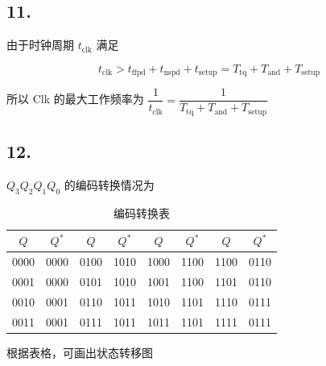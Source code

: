 \documentclass[12pt, a4paper]{ctexart}
\begin{document}
\subsection*{11.}

由于时钟周期 $t_{\text{clk}}$ 满足

\begin{equation}
    t_{\text{clk}}>t_{\text{ffpd}}+t_{\text{nspd}}+t_{\text{setup}}
    =T_{\text{tq}}+T_{\text{and}}+T_{\text{setup}}
\end{equation}

所以 Clk 的最大工作频率为 $\dfrac1{t_{\text{clk}}}=\dfrac1{T_{\text{tq}}+T_{\text{and}}+T_{\text{setup}}}$

\subsection*{12.}

$Q_3Q_2Q_1Q_0$ 的编码转换情况为

\begin{table}[H]
    \centering
    \begin{tabular}{|cc|cc|cc|cc|}
        \hline
        $Q$  & $Q^*$ & $Q$  & $Q^*$ & $Q$  & $Q^*$ & $Q$  & $Q^*$ \\ \hline
        0000 & 0000  & 0100 & 1010  & 1000 & 1100  & 1100 & 0110  \\ \hline
        0001 & 0000  & 0101 & 1010  & 1001 & 1100  & 1101 & 0110  \\ \hline
        0010 & 0001  & 0110 & 1011  & 1010 & 1101  & 1110 & 0111  \\ \hline
        0011 & 0001  & 0111 & 1011  & 1011 & 1101  & 1111 & 0111  \\ \hline
    \end{tabular}
    \caption{编码转换表}
\end{table}

根据表格，可画出状态转移图
\end{document}
